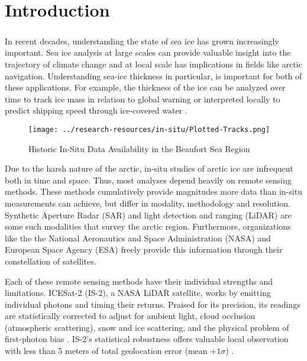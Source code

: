 \chapter{Introduction}
\label{sec:Introduction}

\paragraph{}

\indent In recent decades, understanding the state of sea ice has grown increasingly important. Sea ice analysis at large scales can provide valuable insight into the trajectory of climate change and at local scale has implications in fields like arctic navigation. Understanding sea-ice thickness in particular, is important for both of these applications.  For example, the thickness of the ice can be analyzed over time to track ice mass in relation to global warning or interpreted locally to predict shipping speed through ice-covered water \cite{sea-ice-properties}.

\begin{wrapfigure}{R}{0.35\textwidth}
	\centering
	\texttt{[image: ../research-resources/in-situ/Plotted-Tracks.png]}
	\caption{Historic In-Situ Data Availability in the Beaufort Sea Region}
	\label{fig:foobar}
\end{wrapfigure}


\indent Due to the harsh nature of the arctic, in-situ studies of arctic ice are infrequent both in time and space. Thus, most analyses depend heavily on remote sensing methods. These methods cumulatively provide magnitudes more data than in-situ measurements can achieve, but differ in modality, methodology and resolution. Synthetic Aperture Radar (SAR) and light detection and ranging (LiDAR) are some such modalities that survey the arctic region. Furthermore, organizations like the the National Aeronautics and Space Administration (NASA) and European Space Agency (ESA) freely provide this information through their constellation of satellites.


Each of these remote sensing methods have their individual strengths and limitations. ICESat-2 (IS-2), a NASA LiDAR satellite, works by emitting individual photons and timing their returns.
Praised for its precision, its readings are statistically corrected to adjust for ambient light, cloud occlusion (atmospheric scattering), snow and ice scattering, and the physical problem of first-photon bias \cite{ICESat-2-ATL10-Product}.
IS-2's statistical robustness offers valuable local observation with less than 5 meters of total geolocation error (mean \(+ 1\sigma\)) \cite{ICESat-2-Horizontal-Accuracy}.

